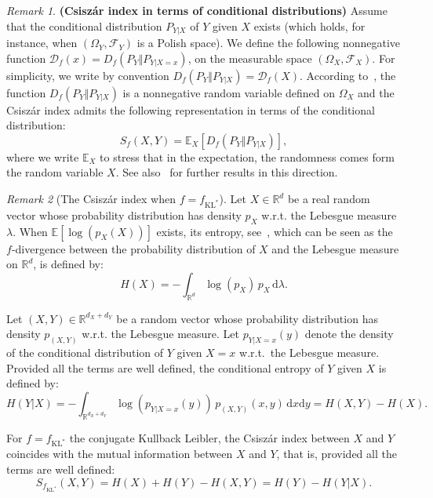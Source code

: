 \documentclass[12pt]{article}
\newcommand{\cd}{{\mathcal D}}
\newcommand{\cf}{{\mathcal F}}
\newcommand{\E}{{\mathbb E}}
\newcommand{\R}{{\mathbb R}}
\newcommand{\rd}{\mathrm{d}}
\theoremstyle{plain}
\theoremstyle{remark}
\newtheorem{rem}{Remark}
\begin{document}
\begin{rem}{\bf (Csisz\'ar index in terms of conditional distributions)}
\label{rem:csiszar_conditional}
Assume that the conditional distribution $P_{Y \vert X}$ of $Y$ given $X$ exists (which holds, for instance, when $(\Omega_Y, \cf_Y)$ is a Polish space). We define the following nonnegative function $\cd_f(x) = D_f(P_Y \Vert P_{Y|X=x})$, on the measurable space $(\Omega_X, \cf_X)$.
For simplicity, we write by convention $
  D_f(P_Y \Vert P_{Y|X})=\cd_f(X)$. According to~\citet[Proposition~7.2]{polyanskiy2025information}, the function $D_f(P_Y \Vert P_{Y|X})$  is a nonnegative random variable defined on $\Omega_X$ and the Csisz\'ar index admits the following representation in terms of the conditional distribution:
\begin{equation}
  \label{eq:Df-kernel}
  S_f(X,Y) = \E_X \left[ D_f(P_Y \Vert P_{Y|X}) \right],
\end{equation}
where we write $\E_X$ to stress that in the expectation, the randomness comes form the random variable $X$. See also~\cite{rahman2016f} for further results in this direction. 
\end{rem}

\begin{rem}[The Csisz\'ar index when $f = f_{\mathrm{KL}^*}$] 
\label{rem:mutual_information} 
Let $X\in \R^d$ be a real random vector whose probability distribution has density $p_X$ w.r.t.  the Lebesgue measure $\lambda$. When $\E[\log(p_X(X))]$ exists, its entropy, see~\cite{cover2006element}, which can be seen as 
the $f$-divergence between the probability distribution of $X$ and the Lebesgue measure on $\R^d$, is defined by:
    \[
        \label{eq:entropy_definition}
        H(X) = - \int_{\R^d} \log (p_X) \, p_X \, \rd \lambda .
      \]
 
      Let $(X,Y) \in \R^{d_X+d_Y}$ be  a random vector whose probability
      distribution   has  density   $p_{(X,Y)}$   w.r.t.  the   Lebesgue
      measure. Let $p_{Y|X=x}(y)$ denote  the density of the conditional
      distribution   of   $Y$   given   $X=x$   w.r.t.\   the   Lebesgue
      measure. Provided  all the terms are well defined, the  conditional entropy of
      $Y$ given $X$ is defined by:
      \[
          H(Y\vert  X) = - \int_{\R^{d_X+d_Y}}  \log (p_{Y|X=x}(y))  \, p_{(X,Y)}(x,y) \, \rd x \rd y = H(X,Y) - H(X).
      \]
  
  For  $f=f_{\mathrm{KL}^*}$  the conjugate Kullback Leibler, the
  Csisz\'ar index between $X$ and $Y$  coincides with the mutual
  information between $X$ and $Y$, that is, provided all the terms are well defined:
  \[
  S_{ f_{\mathrm{KL}^*}}(X,Y)= H(X) + H(Y)-H(X,Y)=
  H(Y) - H(Y\vert  X). 
  \]
\end{rem}
\end{document}
